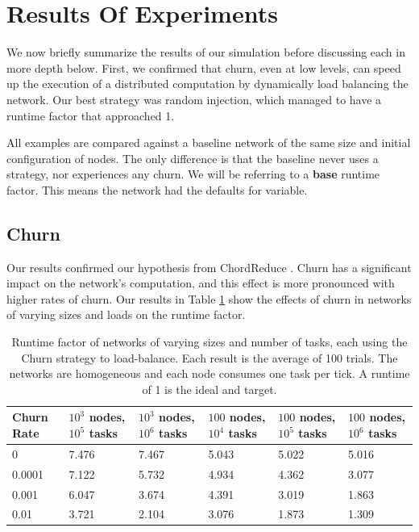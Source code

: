 \documentclass[10pt,conference]{IEEEtran}
\begin{document}
\section{Results Of Experiments}
\label{sec:autonomous-results}

We now briefly summarize the results of our simulation before discussing each in more depth below.
First, we confirmed that churn, even at low levels, can speed up the execution of a distributed computation by dynamically load balancing the network.
Our best strategy was random injection, which managed to have a runtime factor that approached 1.

All examples are compared against a baseline network of the same size and initial configuration of nodes. 
The only difference is that the baseline never uses a strategy, nor experiences any churn.
We will be referring to a \textbf{base} runtime factor.
This means the network had the defaults for variable.
	
	
	\subsection{Churn}
	
	Our results confirmed our hypothesis from ChordReduce \cite{chordreduce}.
	Churn has a significant impact on the network's computation, and this effect is more pronounced with higher rates of churn.
	Our results in Table \ref{tab:ChurnRuntimesHomogenious} show the effects of churn in networks of varying sizes and loads on the runtime factor.
	
	
	\begin{table}[h]
		\small
		\centering
		\caption[Churn Runtimes in a homogenious network]{Runtime factor of networks of varying sizes and number of tasks, each using the Churn strategy to load-balance.  Each result is the average of 100 trials. The networks are homogeneous and each node consumes one task per tick.  A runtime of 1 is the ideal and target.}
		\begin{tabular}{|p{1cm} || p{1cm}  |p{1cm}  |p{1cm}  | p{1cm}  | p{1cm}  |}
			\hline
			Churn Rate & $ 10^{3}$ nodes, $ 10^{5}$ tasks & $ 10^{3}$ nodes, $ 10^{6}$ tasks & $ 100$ nodes, $ 10^{4}$ tasks & $ 100$ nodes, $ 10^{5}$ tasks &$ 100$ nodes, $ 10^{6}$ tasks \\ \hline
			0      & 7.476   &  7.467 &  5.043& 5.022 &5.016 \\\hline
			0.0001 & 7.122   &  5.732 &  4.934& 4.362&3.077 \\\hline
			0.001  & 6.047   &  3.674 &  4.391& 3.019  &1.863\\\hline
			0.01  &  3.721   &  2.104 &  3.076& 1.873 &1.309\\\hline
			
		\end{tabular}
		\label{tab:ChurnRuntimesHomogenious}
	\end{table}
	
\end{document}

